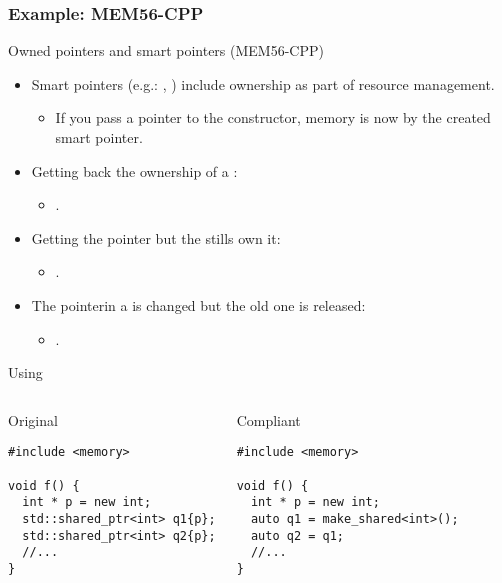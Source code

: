 \subsubsection{Example: MEM56-CPP}

\begin{frame}[t]{Owned pointers and smart pointers (MEM56-CPP)}
\begin{itemize}
  \item Smart pointers (e.g.: , )
        include ownership as part of resource management.
    \begin{itemize}
      \item If you pass a pointer to the constructor, memory is now 
            by the created smart pointer.
    \end{itemize}

  \vfill
  \item Getting back the ownership of a :
    \begin{itemize}
      \item {}.
    \end{itemize}

  \vfill 
  \item Getting the pointer but the  stills own it:
    \begin{itemize}
      \item {}.
    \end{itemize}

  \vfill
  \item The pointerin a  is changed but the old one is released:
    \begin{itemize}
      \item {}.
    \end{itemize}    
\end{itemize}
\end{frame}

\begin{frame}[t,fragile]{Using }
\begin{columns}

\begin{block}{Original}
\begin{lstlisting}
#include <memory>

void f() {
  int * p = new int;
  std::shared_ptr<int> q1{p};
  std::shared_ptr<int> q2{p};
  //...
}
\end{lstlisting}
\end{block}

\pause
{}
\begin{block}{Compliant}
\begin{lstlisting}[escapechar=@]
#include <memory>

void f() {
  int * p = new int;
  auto q1 = make_shared<int>();
  auto q2 = q1;
  //...
}
\end{lstlisting}
\end{block}

\end{columns}
\end{frame}

